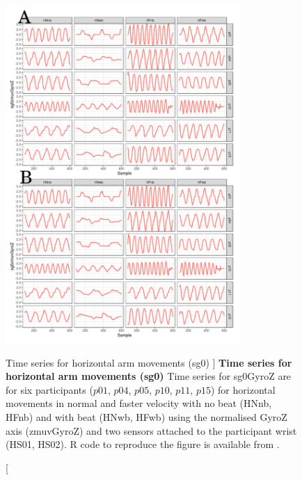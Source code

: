 \begin{figure}
\centering
\includegraphics[width=0.8\textwidth]{tssg0gyroZ}
    	\caption
	[Time series for horizontal arm movements (sg0) ]{
	{\bf Time series for horizontal arm movements (sg0)}
		Time series for sg0GyroZ  are for six participants 
		($p01$, $p04$, $p05$, $p10$, $p11$, $p15$) 
		for horizontal movements in normal and faster velocity with
		no beat	(HNnb, HFnb) and with beat (HNwb, HFwb) using 
		the normalised GyroZ axis (zmuvGyroZ) and 
		two sensors attached to the participant wrist (HS01, HS02).
	R code to reproduce the figure is available from \cite{hwum2018}.
        }
    \label{fig:tssg0gyroZ-hii}
\end{figure}


